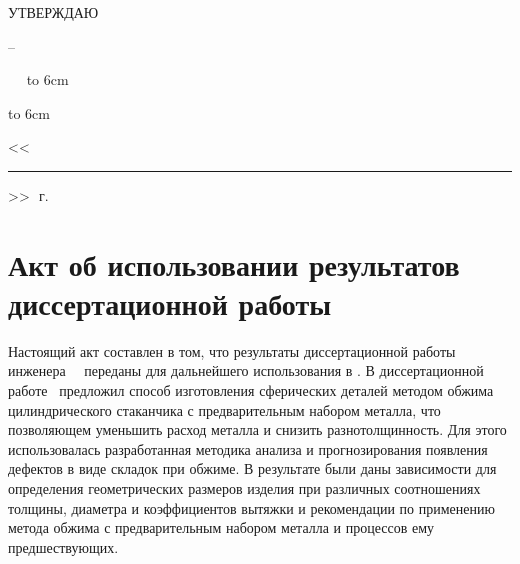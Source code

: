 

\hfill\parbox{6cm}{
	\centerline{УТВЕРЖДАЮ}
	\centerline{\leadingOrganizationHeadPos\---}
	\leadingOrganizationTitle
	
	\ktn~\leadingOrganizationHead\
	\linebreak
	{\hbox to 6cm{\hrulefill}}
	{\hbox to 6cm{<<\rule{7mm}{0.4pt}>>\hrulefill~\number\year\,г.}}}
\vspace{0.5cm}



\section{Акт об использовании результатов диссертационной работы}

Настоящий акт составлен в том, что результаты диссертационной работы инженера \thesisOrganizationShort\ \thesisAuthorShort\ переданы для дальнейшего использования в \leadingOrganizationTitle. В диссертационной работе \thesisAuthorShort\ предложил способ изготовления сферических деталей методом обжима цилиндрического стаканчика с предварительным набором металла, что позволяющем уменьшить расход металла и снизить разнотолщинность. Для этого использовалась разработанная методика анализа и прогнозирования появления дефектов в виде складок при обжиме. В результате были даны зависимости для определения геометрических размеров изделия при различных соотношениях толщины, диаметра и коэффициентов вытяжки и рекомендации по применению метода обжима с предварительным набором металла и процессов ему предшествующих.

